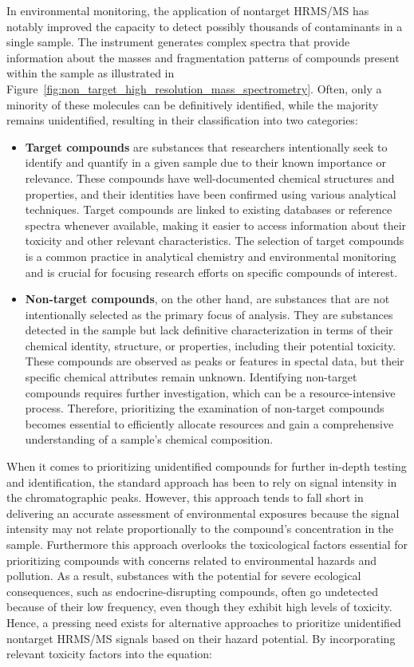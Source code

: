 In environmental monitoring, the application of nontarget HRMS/MS has notably improved the capacity to detect possibly thousands of contaminants in a single sample. The instrument generates complex spectra that provide information about the masses and fragmentation patterns of compounds present within the sample as illustrated in Figure~\ref{fig:non_target_high_resolution_mass_spectrometry}. Often, only a minority of these molecules can be definitively identified, while the majority remains unidentified, resulting in their classification into two categories:
\begin{itemize}
    \item \textbf{Target compounds} are substances that researchers intentionally seek to identify and quantify in a given sample due to their known importance or relevance. These compounds have well-documented chemical structures and properties, and their identities have been confirmed using various analytical techniques. Target compounds are linked to existing databases or reference spectra whenever available, making it easier to access information about their toxicity and other relevant characteristics. The selection of target compounds is a common practice in analytical chemistry and environmental monitoring and is crucial for focusing research efforts on specific compounds of interest.
    \item \textbf{Non-target compounds}, on the other hand, are substances that are not intentionally selected as the primary focus of analysis. They are substances detected in the sample but lack definitive characterization in terms of their chemical identity, structure, or properties, including their potential toxicity. These compounds are observed as peaks or features in spectal data, but their specific chemical attributes remain unknown. Identifying non-target compounds requires further investigation, which can be a resource-intensive process. Therefore, prioritizing the examination of non-target compounds becomes essential to efficiently allocate resources and gain a comprehensive understanding of a sample's chemical composition.
\end{itemize}

When it comes to prioritizing unidentified compounds for further in-depth testing and identification, the standard approach has been to rely on signal intensity in the chromatographic peaks. However, this approach tends to fall short in delivering an accurate assessment of environmental exposures because the signal intensity may not relate proportionally to the compound's concentration in the sample. Furthermore this approach overlooks the toxicological factors essential for prioritizing compounds with concerns related to environmental hazards and pollution. As a result, substances with the potential for severe ecological consequences, such as endocrine-disrupting compounds, often go undetected because of their low frequency, even though they exhibit high levels of toxicity. Hence, a pressing need exists for alternative approaches to prioritize unidentified nontarget HRMS/MS signals based on their hazard potential. By incorporating relevant toxicity factors into the equation:

